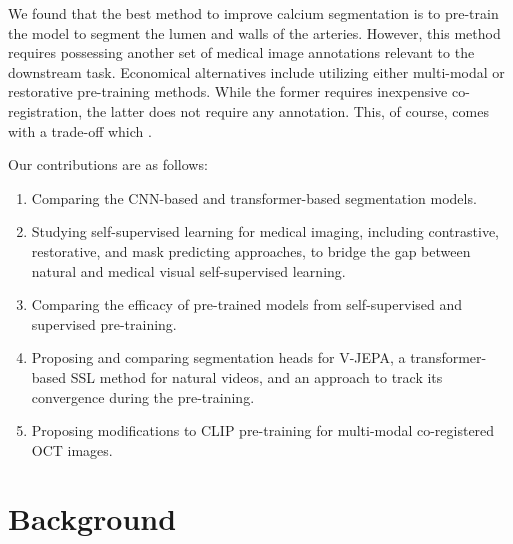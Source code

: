\documentclass[a4paper,11pt,oneside]{report}
\begin{document}
We found that the best method to improve calcium segmentation is to pre-train the model to segment the lumen and walls of the arteries. However, this method requires possessing another set of medical image annotations relevant to the downstream task. Economical alternatives include utilizing either multi-modal or restorative pre-training methods. While the former requires inexpensive co-registration, the latter does not require any annotation. This, of course, comes with a trade-off which .%

Our contributions are as follows:
\begin{enumerate}
    \item Comparing the CNN-based and transformer-based segmentation models.
    \item Studying self-supervised learning for medical imaging, including contrastive, restorative, and mask predicting approaches, to bridge the gap between natural and medical visual self-supervised learning.
    \item Comparing the efficacy of pre-trained models from self-supervised and supervised pre-training.
    \item Proposing and comparing segmentation heads for V-JEPA, a transformer-based SSL method for natural videos, and an approach to track its convergence during the pre-training.
    \item Proposing modifications to CLIP pre-training for multi-modal co-registered OCT images.
\end{enumerate}

\chapter{Background}

\end{document}

